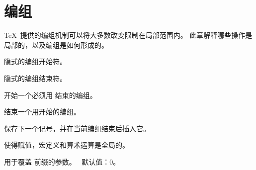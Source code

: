 \documentclass{book}
\begin{document}
\chapter{编组}\label{group}

\TeX\ 提供的编组机制可以将大多数改变限制在局部范围内。
此章解释哪些操作是局部的，以及编组是如何形成的。

\label{cschap:bgroup}\label{cschap:egroup}\label{cschap:begingroup}\label{cschap:endgroup}%
\label{cschap:aftergroup}\label{cschap:global}\label{cschap:globaldefs}
\begin{inventory}
\item [\cs{bgroup}] 
隐式的编组开始符。
\item [\cs{egroup}] 
隐式的编组结束符。
\item [\cs{begingroup}] 
开始一个必须用  结束的编组。
\item [\cs{endgroup}] 
结束一个用开始的编组。
\item [\cs{aftergroup}] 
保存下一个记号，并在当前编组结束后插入它。
\item [\cs{global}] 
使得赋值，宏定义和算术运算是全局的。
\item [\cs{globaldefs}] 
用于覆盖  前缀的参数。
\IniTeX\ 默认值：0。
\end{inventory}
\end{document}

